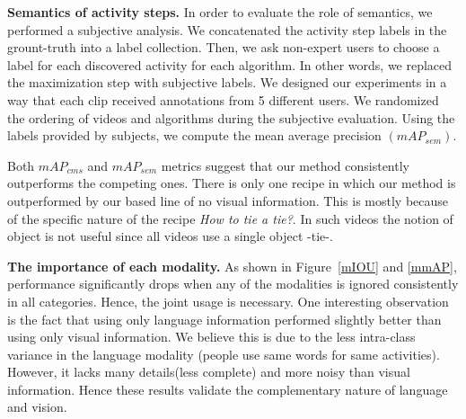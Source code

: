 \vspace{1mm}
\noindent\textbf{Semantics of activity steps.}
In order to evaluate the role of semantics, we performed a subjective analysis. We concatenated the activity step labels in the grount-truth into a label collection. Then, we ask non-expert users to choose a label for each discovered activity for each algorithm. In other words, we replaced the maximization step with subjective labels. We designed our experiments in a way that each clip received annotations from 5 different users. We randomized the ordering of videos and algorithms during the subjective evaluation. Using the labels provided by subjects, we compute the mean average precision $(mAP_{sem})$.

\begin{table}
\caption{Semantic mean-average-precision $mAP_{sem}$.}
{\small
{}}
\normalsize
\vspace{-8mm}
\end{table}

Both $mAP_{cms}$ and $mAP_{sem}$ metrics suggest that our method consistently outperforms the competing ones. There is only one recipe in which our method is outperformed by our based line of no visual information. This is mostly because of the specific nature of the recipe \emph{How to tie a tie?}. In such videos the notion of object is not useful since all videos use a single object -tie-.

\vspace{1mm}
\noindent\textbf{The importance of each modality.}
As shown in Figure~\ref{mIOU} and \ref{mmAP}, performance significantly drops when any of the modalities is ignored consistently in all categories. Hence, the joint usage is necessary. One interesting observation is the fact that using only language information performed slightly better than using only visual information. We believe this is due to the less intra-class variance in the language modality (\ie people use same words for same activities). However, it lacks many details(less complete) and more noisy than visual information. Hence these results validate the complementary nature of language and vision.

